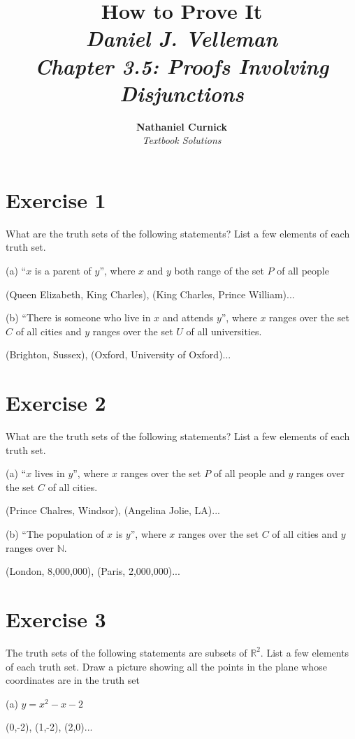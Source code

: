 \documentclass[11pt]{article}
\title{\textbf{How to Prove It} \\ {\Large\itshape Daniel J. Velleman} \\ {\Large\itshape Chapter 3.5: Proofs Involving Disjunctions}}
\author{\textbf{Nathaniel Curnick} \\ \textit{Textbook Solutions}}
\date{}
\begin{document}
\maketitle

\section*{Exercise 1}

What are the truth sets of the following statements? List a few elements of each 
truth set.

\noindent (a) ``$x$ is a parent of $y$'', where $x$ and $y$ both range of the 
set $P$ of all people 

(Queen Elizabeth, King Charles), (King Charles, Prince William)... 

\noindent (b) ``There is someone who live in $x$ and attends $y$'', where 
$x$ ranges over the set $C$ of all cities and $y$ ranges over the set $U$ of all 
universities.

(Brighton, Sussex), (Oxford, University of Oxford)... 

\section*{Exercise 2}

What are the truth sets of the following statements? List a few elements of each 
truth set.

\noindent (a) ``$x$ lives in $y$'', where $x$ ranges over the set $P$ of all 
people and $y$ ranges over the set $C$ of all cities.

(Prince Chalres, Windsor), (Angelina Jolie, LA)... 

\noindent (b) ``The population of $x$ is $y$'', where $x$ ranges over the set $C$
of all cities and $y$ ranges over $\mathbb{N}$.

(London, 8,000,000), (Paris, 2,000,000)... 

\section*{Exercise 3}

The truth sets of the following statements are subsets of $\mathbb{R}^2$. List a 
few elements of each truth set. Draw a picture showing all the points in the plane 
whose coordinates are in the truth set 

\noindent (a) $y = x^2 - x - 2$

(0,-2), (1,-2), (2,0)... 
\end{document}

